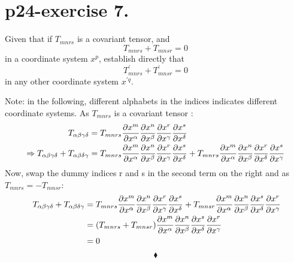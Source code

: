 \section{p24-exercise 7.}
\begin{tcolorbox}
Given that if $T_{mnrs}$ is a covariant tensor, and 
$$ T_{mnrs}+T_{mnsr} = 0$$ in a coordinate system $x^{p}$, establish directly that $$ T^{'}_{mnrs}+T^{'}_{mnsr} = 0$$ in any other coordinate system $x^{'q}$.
\end{tcolorbox}
Note: in the following, different alphabets in the indices indicates different coordinate systems.
As $T_{mnrs}$ is a covariant tensor :
\begin{align}
\ T_{\alpha\beta\gamma\delta} &=  T_{mnrs}\pdv{x^{m}}{x^{\alpha}}\pdv{x^{n}}{x^{\beta}}\pdv{x^{r}}{x^{\gamma}}\pdv{x^{s}}{x^{\delta}}\\
\Rightarrow T_{\alpha\beta\gamma\delta}+T_{\alpha\beta\delta\gamma} &= T_{mnrs}\pdv{x^{m}}{x^{\alpha}}\pdv{x^{n}}{x^{\beta}}\pdv{x^{r}}{x^{\gamma}}\pdv{x^{s}}{x^{\delta}}+ T_{mnrs}\pdv{x^{m}}{x^{\alpha}}\pdv{x^{n}}{x^{\beta}}\pdv{x^{r}}{x^{\delta}}\pdv{x^{s}}{x^{\gamma}}
\end{align}
Now, swap the dummy indices r and s in the second term on the right and as $T_{mnrs} = - T_{mnsr}$:
\begin{align}
\ T_{\alpha\beta\gamma\delta}+T_{\alpha\beta\delta\gamma} &= T_{mnrs}\pdv{x^{m}}{x^{\alpha}}\pdv{x^{n}}{x^{\beta}}\pdv{x^{r}}{x^{\gamma}}\pdv{x^{s}}{x^{\delta}}+ T_{mnsr}\pdv{x^{m}}{x^{\alpha}}\pdv{x^{n}}{x^{\beta}}\pdv{x^{s}}{x^{\delta}}\pdv{x^{r}}{x^{\gamma}}\\
&= (T_{mnrs}+ T_{mnsr})\pdv{x^{m}}{x^{\alpha}}\pdv{x^{n}}{x^{\beta}}\pdv{x^{s}}{x^{\delta}}\pdv{x^{r}}{x^{\gamma}}\\&=0
\end{align}
$$\blacklozenge$$
\pagebreak[4]


